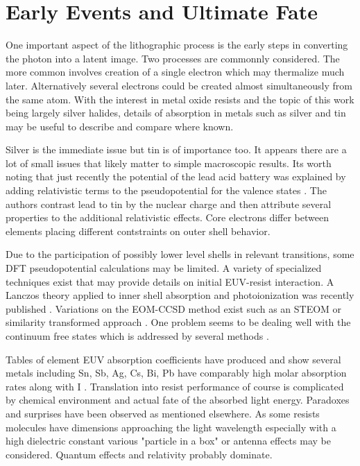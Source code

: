 


\section{Early Events and Ultimate Fate }

One important aspect of the lithographic process is
the early steps in converting the photon into
a latent image. Two processes are commonnly considered.
The more common involves creation of a single electron 
which may thermalize much later. Alternatively several 
electrons could be created almost simultaneously from
the same atom.
With the interest in metal oxide resists and the topic
of this work being largely silver halides, details of
absorption in metals such as silver and tin may be useful
to describe and compare where known. 

Silver is the immediate issue but tin is of importance
too. It appears there are a lot of small issues that likely
matter to simple macroscopic results. 
Its worth noting that just recently the potential of the lead
acid battery was explained by adding relativistic terms to 
the pseudopotential for the valence states
\cite{Ahuja_Blomqvist_Larsson_Relativity_Lead_2011}.
The authors contrast lead to tin by the nuclear charge and
then attribute several properties to the additional
relativistic effects. Core electrons differ between
elements placing different contstraints on outer
shell behavior. 


Due to the participation of possibly lower level shells in
relevant transitions, some DFT pseudopotential calculations
may be limited. A variety of specialized techniques exist
that may provide details on initial EUV-resist interaction.
A Lanczos theory applied to inner shell absorption and photoionization
was recently published
\cite{Moitra_Coriani_CabralTenorio_Inner_shell_photoabsorption_2021}.
Variations on the EOM-CCSD method exist such as an
STEOM  or similarity transformed approach \cite{doi:10.1021/acs.jctc.4c01181}.
One problem seems to be dealing well with the continuum free states
which is addressed by several methods
\cite{doi:10.1021/acs.jctc.1c00303}.

Tables of element EUV absorption coefficients have produced
and show several metals including Sn, Sb, Ag, Cs, Bi, Pb have
comparably high molar absorption rates  along with I 
\cite{PMC11433861}. Translation into resist performance of course
is complicated by chemical environment and actual fate of the
absorbed light energy. Paradoxes and surprises have been observed
as mentioned elsewhere. As some resists molecules have dimensions 
approaching the light wavelength especially with a high dielectric constant
various "particle in a box" or antenna effects may be considered.
Quantum effects and relativity probably dominate.  

